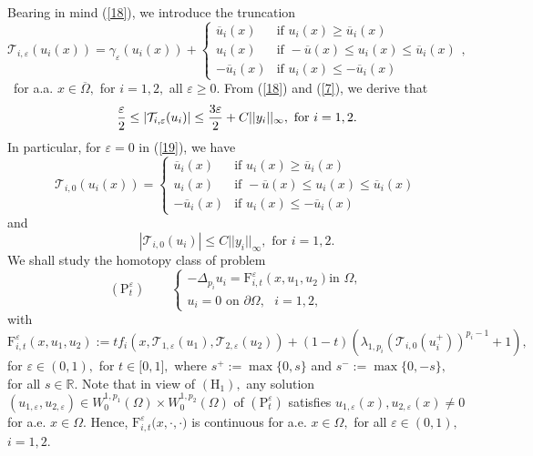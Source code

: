 \documentclass[11pt]{amsart}
\theoremstyle{definition}
\theoremstyle{remark}
\numberwithin{equation}{section}
\begin{document}
Bearing in mind (\ref{18}), we introduce the truncation 
\begin{equation}
\mathcal{T}_{i,\varepsilon }(u_{i}(x))=\gamma _{\varepsilon
}(u_{i}(x))+\left\{ 
\begin{array}{ll}
\overline{u}_{i}(x) & \text{if \ }u_{i}(x)\geq \overline{u}_{i}(x) \\ 
u_{i}(x) & \text{if \ }-\overline{u}(x)\leq u_{i}(x)\leq \overline{u}_{i}(x)
\\ 
-\overline{u}_{i}(x) & \text{if \ }u_{i}(x)\leq -\overline{u}_{i}(x)%
\end{array}%
\right. ,  \label{19}
\end{equation}%
\ for a.a. $x\in \overline{\Omega },$ for $i=1,2,$ all $\varepsilon \geq 0.$
From (\ref{18}) and (\ref{7}), we derive that%
\begin{equation}
\frac{\varepsilon }{2}\leq |\mathcal{T}_{i,\varepsilon }(u_{i})|\leq \frac{%
3\varepsilon }{2}+C||y_{i}||_{\infty },\text{ for }i=1,2.  \label{20}
\end{equation}%
In particular, for $\varepsilon =0$ in (\ref{19}), we have%
\begin{equation}
\mathcal{T}_{i,0}(u_{i}(x))=\left\{ 
\begin{array}{ll}
\overline{u}_{i}(x) & \text{if \ }u_{i}(x)\geq \overline{u}_{i}(x) \\ 
u_{i}(x) & \text{if \ }-\overline{u}(x)\leq u_{i}(x)\leq \overline{u}_{i}(x)
\\ 
-\overline{u}_{i}(x) & \text{if \ }u_{i}(x)\leq -\overline{u}_{i}(x)%
\end{array}%
\right.
\end{equation}%
and%
\begin{equation}
|\mathcal{T}_{i,0}(u_{i})|\leq C||y_{i}||_{\infty },\text{ for }i=1,2.
\end{equation}%
We shall study the homotopy class of problem%
\begin{equation*}
(\mathrm{P}_{t}^{\varepsilon })\qquad \left\{ 
\begin{array}{l}
-\Delta _{p_{i}}u_{i}=\mathrm{F}_{i,t}^{\varepsilon }({x,}u_{1},u_{2})\text{
in }\Omega , \\ 
u_{i}=0\text{ \ on }\partial \Omega ,\text{ \ }i=1,2,%
\end{array}%
\right.
\end{equation*}%
with%
\begin{equation*}
\mathrm{F}_{i,t}^{\varepsilon }(x,u_{1},u_{2}):=tf_{i}(x,\mathcal{T}%
_{1,\varepsilon }(u_{1}),\mathcal{T}_{2,\varepsilon }(u_{2}))+(1-t)(\lambda
_{1,p_{i}}(\mathcal{T}_{i,0}(u_{i}^{+}))^{p_{i}-1}+1),
\end{equation*}%
for $\varepsilon \in (0,1),$ for $t\in \lbrack 0,1],$ where $s^{+}:=\max
\{0,s\}$ and $s^{-}:=\max \{0,-s\},$ for all $s\in 
\mathbb{R}
$. Note that in view of $(\mathrm{H}_{1}),$ any solution $(u_{1,\varepsilon
},u_{2,\varepsilon })\in W_{0}^{1,p_{1}}(\Omega )\times
W_{0}^{1,p_{2}}(\Omega )$ of $(\mathrm{P}_{t}^{\varepsilon })$ satisfies $%
u_{1,\varepsilon }(x),u_{2,\varepsilon }(x)\neq 0$ for a.e. $x\in \Omega $.
Hence, $\mathrm{F}_{i,t}^{\varepsilon }{(x},\cdot ,\cdot )$ is continuous
for a.e. $x\in \Omega ,$ for all $\varepsilon \in (0,1),$ $i=1,2$.
\end{document}
